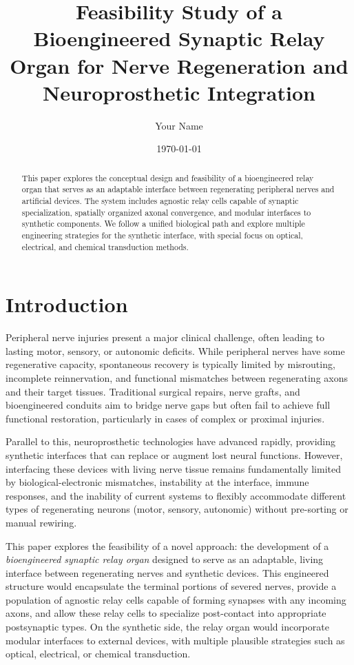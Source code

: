 \documentclass[12pt]{article}
\title{Feasibility Study of a Bioengineered Synaptic Relay Organ for Nerve Regeneration and Neuroprosthetic Integration}
\author{Your Name}
\date{\today}
\begin{document}
	
	\maketitle
	
	\begin{abstract}
		This paper explores the conceptual design and feasibility of a bioengineered relay organ that serves as an adaptable interface between regenerating peripheral nerves and artificial devices. The system includes agnostic relay cells capable of synaptic specialization, spatially organized axonal convergence, and modular interfaces to synthetic components. We follow a unified biological path and explore multiple engineering strategies for the synthetic interface, with special focus on optical, electrical, and chemical transduction methods.
	\end{abstract}
	
	\tableofcontents
	
	\section{Introduction}
	
	Peripheral nerve injuries present a major clinical challenge, often leading to lasting motor, sensory, or autonomic deficits. While peripheral nerves have some regenerative capacity, spontaneous recovery is typically limited by misrouting, incomplete reinnervation, and functional mismatches between regenerating axons and their target tissues. Traditional surgical repairs, nerve grafts, and bioengineered conduits aim to bridge nerve gaps but often fail to achieve full functional restoration, particularly in cases of complex or proximal injuries.
	
	Parallel to this, neuroprosthetic technologies have advanced rapidly, providing synthetic interfaces that can replace or augment lost neural functions. However, interfacing these devices with living nerve tissue remains fundamentally limited by biological-electronic mismatches, instability at the interface, immune responses, and the inability of current systems to flexibly accommodate different types of regenerating neurons (motor, sensory, autonomic) without pre-sorting or manual rewiring.
	
	This paper explores the feasibility of a novel approach: the development of a \textit{bioengineered synaptic relay organ} designed to serve as an adaptable, living interface between regenerating nerves and synthetic devices. This engineered structure would encapsulate the terminal portions of severed nerves, provide a population of agnostic relay cells capable of forming synapses with any incoming axons, and allow these relay cells to specialize post-contact into appropriate postsynaptic types. On the synthetic side, the relay organ would incorporate modular interfaces to external devices, with multiple plausible strategies such as optical, electrical, or chemical transduction.
	
\end{document}
